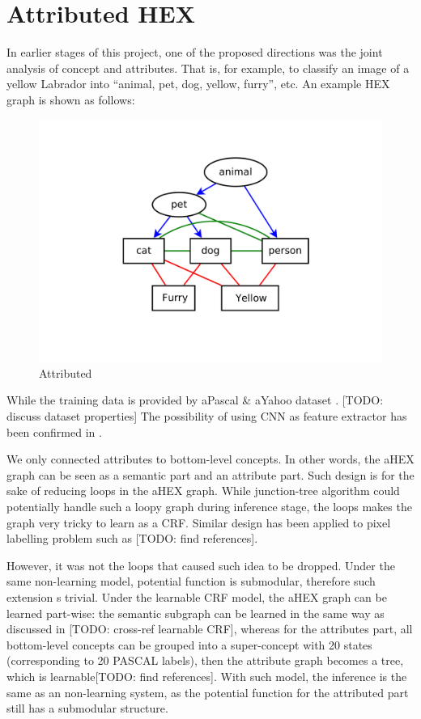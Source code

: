 \documentclass[11pt,a4paper]{article}
\begin{document}
\section{Attributed HEX}

In earlier stages of this project, one of the proposed directions was the joint analysis of concept and attributes. That is, for example, to classify an image of a yellow Labrador into ``animal, pet, dog, yellow, furry'', etc. An example HEX graph is shown as follows:
\begin{figure}[htbp]
\centering
\includegraphics[scale=0.5]{ahex.pdf}
\caption{Attributed}
\label{fig:ahex}
\end{figure}

While the training data is provided by aPascal \& aYahoo dataset \cite{farhadi2009describing}. [TODO: discuss dataset properties] The possibility of using CNN as feature extractor has been confirmed in \cite{razavian2014cnn}.

We only connected attributes to bottom-level concepts. In other words, the aHEX graph can be seen as a semantic part and an attribute part. Such design is for the sake of reducing loops in the aHEX graph. While junction-tree algorithm could potentially handle such a loopy graph during inference stage, the loops makes the graph very tricky to learn as a CRF. Similar design has been applied to pixel labelling problem such as [TODO: find references].

However, it was not the loops that caused such idea to be dropped. Under the same non-learning model, potential function is submodular, therefore such extension s trivial. Under the learnable CRF model, the aHEX graph can be learned part-wise: the semantic subgraph can be learned in the same way as discussed in [TODO: cross-ref learnable CRF], whereas for the attributes part, all bottom-level concepts can be grouped into a super-concept with 20 states (corresponding to 20 PASCAL labels), then the attribute graph becomes a tree, which is learnable[TODO: find references]. With such model, the inference is the same as an non-learning system, as the potential function for the attributed part still has a submodular structure.
\end{document}
